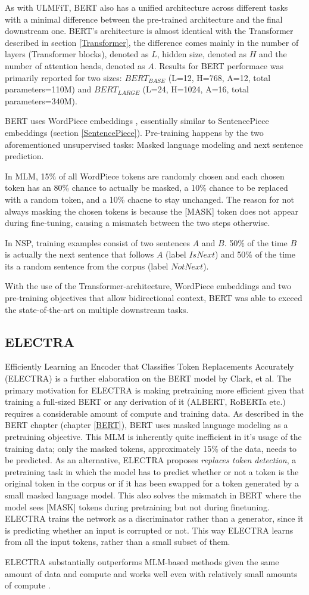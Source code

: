 As with ULMFiT, BERT also has a unified architecture across different tasks with a minimal difference between the pre-trained architecture and the final downstream one.
BERT's architecture is almost identical with the Transformer described in section \ref{Transformer}, the difference comes mainly in the number of layers (Transformer blocks), denoted as $L$, hidden size, denoted as $H$ and the number of attention heads, denoted as $A$.
Results for BERT performace was primarily reported for two sizes: $BERT_{BASE}$ (L=12, H=768, A=12, total parameters=110M) and $BERT_{LARGE}$ (L=24, H=1024, A=16, total parameters=340M).

BERT uses WordPiece embeddings \cite{wu2016}, essentially similar to SentencePiece embeddings (section \ref{SentencePiece}).
Pre-training happens by the two aforementioned unsupervised tasks: Masked language modeling and next sentence prediction.

In MLM, 15\% of all WordPiece tokens are randomly chosen and each chosen token has an 80\% chance to actually be masked, a 10\% chance to be replaced with a random token, and a 10\% chacne to stay unchanged.
The reason for not always masking the chosen tokens is because the [MASK] token does not appear during fine-tuning, causing a mismatch between the two steps otherwise.

In NSP, training examples consist of two sentences $A$ and $B$.
50\% of the time $B$ is actually the next sentence that follows $A$ (label $IsNext$) and 50\% of the time its a random sentence from the corpus (label $NotNext$).

With the use of the Transformer-architecture, WordPiece embeddings and two pre-training objectives that allow bidirectional context, BERT was able to exceed the state-of-the-art on multiple downstream tasks.

\subsection{ELECTRA} \label{ELECTRA}
Efficiently Learning an Encoder that Classifies Token Replacements Accurately (ELECTRA) is a further elaboration on the BERT model by Clark, et al. \cite{clark2020}
The primary motivation for ELECTRA is making pretraining more efficient given that training a full-sized BERT or any derivation of it (ALBERT, RoBERTa etc.) requires a considerable amount of compute and training data.
As described in the BERT chapter (chapter \ref{BERT}), BERT uses masked language modeling as a pretraining objective.
This MLM is inherently quite inefficient in it's usage of the training data; only the masked tokens, approximately 15\% of the data, needs to be predicted.
As an alternative, ELECTRA proposes \textit{replaces token detection}, a pretraining task in which the model has to predict whether or not a token is the original token in the corpus or if it has been swapped for a token generated by a small masked language model.
This also solves the mismatch in BERT where the model sees [MASK] tokens during pretraining but not during finetuning.
ELECTRA trains the network as a discriminator rather than a generator, since it is predicting whether an input is corrupted or not.
This way ELECTRA learns from all the input tokens, rather than a small subset of them.

ELECTRA substantially outperforms MLM-based methods given the same amount of data and compute and works well even with relatively small amounts of compute \cite{clark2020}.
